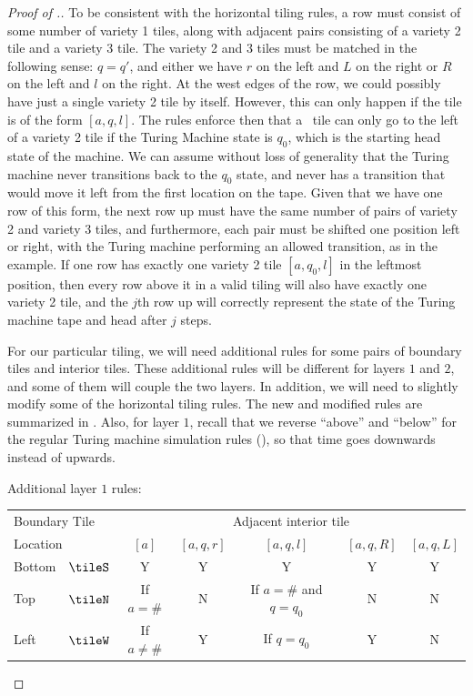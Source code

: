 \begin{proof}[Proof of .]
To be consistent with the horizontal tiling rules, a row must consist of some number of variety 1 tiles, along with adjacent pairs consisting of a variety 2 tile and a variety 3 tile.  The variety 2 and 3 tiles must be matched in the following sense: $q = q'$, and either we have $r$ on the left and $L$ on the right or $R$ on the left and $l$ on the right.
%
At the west edges of the row, we could possibly have just a single variety 2 tile by itself.
However, this can only happen if the tile is of the form $[a,q,l]$.
The rules enforce then that a \tileW\ tile can only go to the left of a variety 2 tile if
the Turing Machine state is $q_0$, which
is the starting head state of the machine.  We can assume without loss of
generality that the Turing machine never transitions back to the $q_0$ state, and
never has a transition that would move it left from the first location on the tape.
%
Given that we have one row of this form, the next row up must have the
same number of pairs of variety 2 and variety 3 tiles, and furthermore,
each pair must be shifted one position left or right, with the Turing
machine performing an allowed transition, as in the example.  If one row
has exactly one variety 2 tile $[a,q_0,l]$ in the leftmost position, then every row
above it in a valid tiling will also have exactly one variety 2 tile, and the $j$th
row up will correctly represent the state of the Turing machine tape and head after $j$ steps.

For our particular tiling, we will need additional rules for some pairs of boundary tiles and interior tiles.  These additional rules will be different for layers $1$ and $2$, and some of them will couple the two layers.  In addition, we will need to slightly modify some of the horizontal tiling rules.  The new and modified rules are summarized in .  Also, for layer $1$, recall that we reverse ``above'' and ``below'' for the regular Turing machine simulation rules (), so that time goes downwards instead of upwards.
\begin{table}
Additional layer $1$ rules:
\smallskip
\begin{centering}
\begin{tabular}{lc|ccccc}
\multicolumn{2}{l|}{Boundary Tile} &                \multicolumn{5}{c}{Adjacent interior tile} \\
\multicolumn{2}{l|}{Location} & $[a]$ & $[a,q,r]$ & $[a,q,l]$          & $[a,q,R]$ & $[a,q,L]$ \\
 \hline
Bottom & $\tileS$    &    Y        &     Y     &         Y             &    Y      &    Y     \\
Top    & $\tileN$    & If $a=\#$   &     N     & If $a=\#$ and $q=q_0$ &    N      &    N      \\
Left   & $\tileW$    & If $a \neq \#$ &  Y     & If $q=q_0$            &    Y      &    N      \\
\end{tabular}


\end{centering}
\end{table}
\end{proof}
